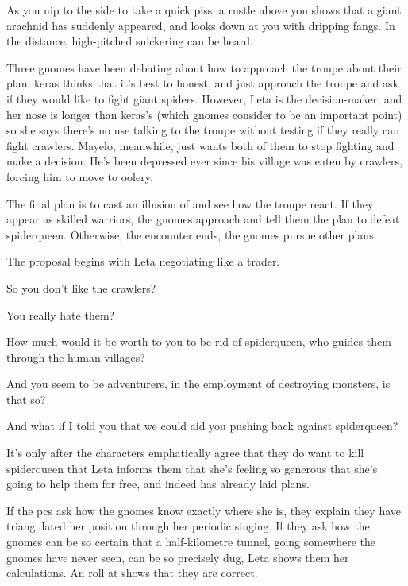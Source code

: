 \begin{boxtext}
  As you nip to the side to take a quick piss, a rustle above you shows that a giant arachnid has suddenly appeared, and looks down at you with dripping fangs.
  In the distance, high-pitched snickering can be heard.
\end{boxtext}

\begin{exampletext}
  Three gnomes have been debating about how to approach the troupe about their plan.
  \Gls{keras} thinks that it's best to honest, and just approach the troupe and ask if they would like to fight giant spiders.
  However, Leta is the decision-maker, and her nose is longer than \gls{keras}'s (which gnomes consider to be an important point) so she says there's no use talking to the troupe without testing if they really can fight \glspl{crawler}.
  Mayelo, meanwhile, just wants both of them to stop fighting and make a decision.
  He's been depressed ever since his \gls{village} was eaten by \glspl{crawler}, forcing him to move to \gls{oolery}.
\end{exampletext}

\null

The final plan is to cast an illusion of  and see how the troupe react.
If they appear as skilled warriors, the gnomes approach and tell them the plan to defeat \gls{spiderqueen}.
Otherwise, the encounter ends, the gnomes pursue other plans.

The proposal begins with Leta negotiating like a trader.

\begin{speechtext}
  So you don't like the \glspl{crawler}?

  You really hate them?

  How much would it be worth to you to be rid of \gls{spiderqueen}, who guides them through the human \glspl{village}?

  And you seem to be adventurers, in the employment of destroying monsters, is that so?

  And what if I told you that we could aid you pushing back against \gls{spiderqueen}?
\end{speechtext}

It's only after the characters emphatically agree that they do want to kill \gls{spiderqueen} that Leta informs them that she's feeling so generous that she's going to help them for free, and indeed has already laid plans.

If the \glspl{pc} ask how the gnomes know exactly where she is, they explain they have triangulated her position through her periodic singing.
If they ask how the gnomes can be so certain that a half-kilometre tunnel, going somewhere the gnomes have never seen, can be so precisely dug, Leta shows them her calculations.
An  roll at \tn[11] shows that they are correct.

